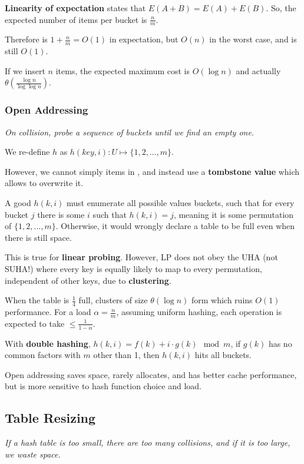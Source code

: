\textbf{Linearity of expectation} states that $E(A + B) = E(A) + E(B)$.
So, the expected number of items per bucket is $\frac{n}{m}$.

Therefore  is $1 + \frac{n}{m} = O(1)$ in expectation, but $O(n)$ in the worst case, and  is still $O(1)$.

If we insert $n$ items, the expected maximum cost is $O(\log n)$ and actually $\theta(\frac{\log n}{\log \log n})$.

\subsubsection{Open Addressing}
\emph{On collision, probe a sequence of buckets until we find an empty one.}

We re-define $h$ as $h(key, i) : U \mapsto \{ 1, 2, \dots, m \}$.

However, we cannot simply  items in , and instead use a \textbf{tombstone value}
which allows  to overwrite it.

A good $h(k, i)$ must enumerate all possible values buckets, such that for every bucket $j$ there is some $i$ such that $h(k, i) = j$,
meaning it is some permutation of $\{ 1, 2, \dots, m \}$.
Otherwise, it would wrongly declare a table to be full even when there is still space.

This is true for \textbf{linear probing}.
However, LP does not obey the UHA (not SUHA!) where every key is equally likely to map to every permutation,
independent of other keys, due to \textbf{clustering}.

When the table is $\frac{1}{4}$ full, clusters of size $\theta(\log n)$ form which ruins $O(1)$ performance.
For a load $\alpha = \frac{n}{m}$, assuming uniform hashing, each operation is expected to take $\leq \frac{1}{1 - \alpha}$.

With \textbf{double hashing}, $h(k, i) = f(k) + i \cdot g(k) \!\!\! \mod{m}$, if $g(k)$ has no common factors with $m$ other than 1,
then $h(k, i)$ hits all buckets.

Open addressing saves space, rarely allocates, and has better cache performance,
but is more sensitive to hash function choice and load.

\subsection{Table Resizing}
\emph{If a hash table is too small, there are too many collisions, and if it is too large, we waste space.}

